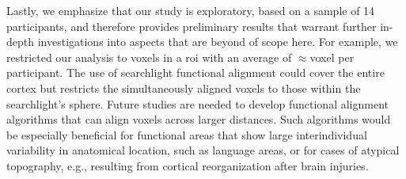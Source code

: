 %
Lastly, we emphasize that our study is exploratory, based on a sample of 14
participants, and therefore provides preliminary results that warrant further
in-depth investigations into aspects that are beyond of scope here.
%
For example, we restricted our analysis to voxels in a \ac{roi} with an average
of $\approx$\unit[1600]{voxel} per participant.
%
The use of searchlight functional alignment
\citep[e.g.,][]{zhang2016searchlight, guntupalli2016model} could cover the
entire cortex but restricts the simultaneously aligned voxels to those within
the searchlight's sphere.
%
Future studies are needed to develop functional alignment algorithms that can
align voxels across larger distances.
%
Such algorithms would be especially beneficial for functional areas that show
large interindividual variability in anatomical location, such as language
areas, or for cases of atypical topography, e.g., resulting from cortical
reorganization after brain injuries.




